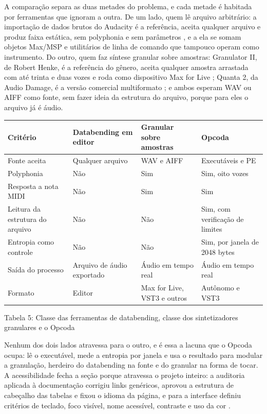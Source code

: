 \documentclass[11pt,a4paper]{article}
\begin{document}
A comparação separa as duas metades do problema, e cada metade é habitada por ferramentas que ignoram a outra. De um lado, quem lê arquivo arbitrário: a importação de dados brutos do Audacity é a referência, aceita qualquer arquivo e produz faixa estática, sem polyphonia e sem parâmetros \cite{audacityraw}, e a ela se somam objetos Max/MSP e utilitários de linha de comando que tampouco operam como instrumento. Do outro, quem faz síntese granular sobre amostras: Granulator II, de Robert Henke, é a referência do gênero, aceita qualquer amostra arrastada com até trinta e duas vozes e roda como dispositivo Max for Live \cite{granulatorii}; Quanta 2, da Audio Damage, é a versão comercial multiformato \cite{quanta2}; e ambos esperam WAV ou AIFF como fonte, sem fazer ideia da estrutura do arquivo, porque para eles o arquivo já é áudio.


\begin{center}
\scriptsize
\setlength{\tabcolsep}{4pt}
\begin{tabular}{p{}|p{}|p{}|p{}}
\hline
\textbf{Critério} & \textbf{Databending em editor} & \textbf{Granular sobre amostras} & \textbf{Opcoda} \\
\hline
Fonte aceita & Qualquer arquivo & WAV e AIFF & Executáveis e PE \\
Polyphonia & Não & Sim & Sim, oito vozes \\
Resposta a nota MIDI & Não & Sim & Sim \\
Leitura da estrutura do arquivo & Não & Não & Sim, com verificação de limites \\
Entropia como controle & Não & Não & Sim, por janela de 2048 bytes \\
Saída do processo & Arquivo de áudio exportado & Áudio em tempo real & Áudio em tempo real \\
Formato & Editor & Max for Live, VST3 e outros & Autônomo e VST3 \\
\hline
\end{tabular}
\end{center}
\noindent Tabela 5: Classe das ferramentas de databending, classe dos sintetizadores granulares e o Opcoda\par
\label{tab:5}
\vspace{2pt}{\footnotesize\noindent Autores\par}

Nenhum dos dois lados atravessa para o outro, e é essa a lacuna que o Opcoda ocupa: lê o executável, mede a entropia por janela e usa o resultado para modular a granulação, herdeiro do databending na fonte e do granular na forma de tocar. A acessibilidade fecha a seção porque atravessa o projeto inteiro: a auditoria aplicada à documentação corrigiu links genéricos, aprovou a estrutura de cabeçalho das tabelas e fixou o idioma da página, e para a interface definiu critérios de teclado, foco visível, nome acessível, contraste e uso da cor \cite{w3cwcag22, w3cwcagem}.
\end{document}
